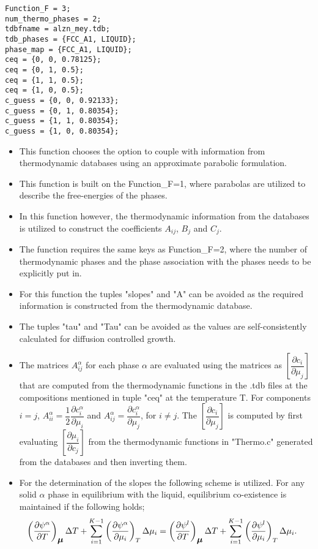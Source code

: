 \documentclass[a4paper,10pt]{article}
\newcommand{\vmu}{\mbox{\boldmath{$\mu$}}}
\begin{document}
\begin{lstlisting}
Function_F = 3;
num_thermo_phases = 2;
tdbfname = alzn_mey.tdb;
tdb_phases = {FCC_A1, LIQUID};
phase_map = {FCC_A1, LIQUID};
ceq = {0, 0, 0.78125};
ceq = {0, 1, 0.5};
ceq = {1, 1, 0.5};
ceq = {1, 0, 0.5};
c_guess = {0, 0, 0.92133};
c_guess = {0, 1, 0.80354};
c_guess = {1, 1, 0.80354};
c_guess = {1, 0, 0.80354};
\end{lstlisting}

\begin{itemize}
 \item This function chooses the option to couple with information from thermodynamic databases using an approximate parabolic formulation.
 \item This function is built on the Function\_F=1, where parabolas are utilized to describe the free-energies of the phases. 
 \item In this function however, the thermodynamic information from the databases is utilized to construct the coefficients $A_{ij}$, $B_{j}$ and $C_j$. 
 \item The function requires the same keys as Function\_F=2, where the number of thermodynamic phases and the phase association with the 
 phases needs to be explicitly put in. 
 \item For this function the tuples "slopes" and "A" can be avoided as the required information is constructed from the thermodynamic 
 database.
 \item The tuples "tau" and "Tau" can be avoided as the values are self-consistently calculated for diffusion controlled growth.
 \item The matrices $A_{ij}^{\alpha}$ for each phase $\alpha$ are evaluated using the matrices as $\left[\dfrac{\partial c_i}{\partial \mu_j}\right]$ that 
 are computed from the thermodynamic functions in the .tdb files at the compositions mentioned in tuple "ceq" at the temperature T. For components $i=j$, 
 $A_{ii}^{\alpha} = \dfrac{1}{2}\dfrac{\partial c_i^{\alpha}}{\partial \mu_i}$ and  $A_{ij}^{\alpha} = \dfrac{\partial c_i^{\alpha}}{\partial \mu_j}$, for $i\neq j$.
 The $\left[\dfrac{\partial c_i}{\partial \mu_j}\right]$ is computed by first evaluating $\left[\dfrac{\partial \mu_i}{\partial c_j}\right]$ from the 
 thermodynamic functions in "Thermo.c" generated from the databases and then inverting them.
 
 \item For the determination of the slopes the following scheme is utilized. For any solid $\alpha$ phase in equilibrium with the liquid, 
 equilibrium co-existence is maintained if the following holds;
 \begin{align*}
  \left(\dfrac{\partial \psi^{\alpha}}{\partial T}\right)_{\vmu} \Delta T + \sum_{i=1}^{K-1} \left(\dfrac{\partial \psi^\alpha}{\partial \mu_i}\right)_T\Delta \mu_i &=
  \left(\dfrac{\partial \psi^l}{\partial T}\right)_{\vmu} \Delta T + \sum_{i=1}^{K-1} \left(\dfrac{\partial \psi^l}{\partial \mu_i}\right)_T\Delta \mu_i.
 \end{align*}
 

\end{itemize}
\end{document}
